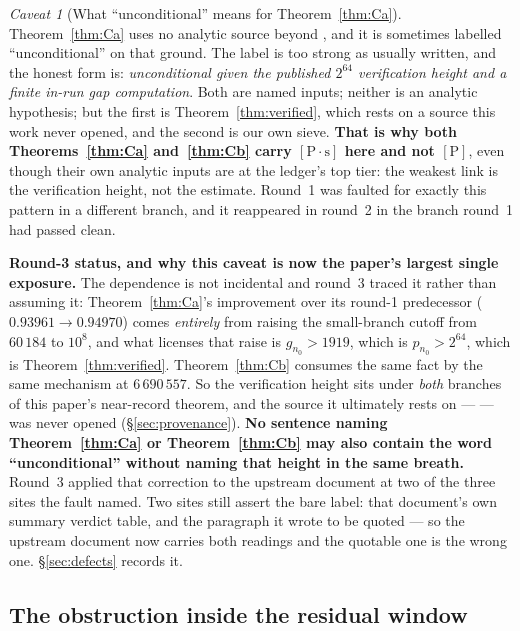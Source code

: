 \documentclass[11pt,a4paper]{article}
\theoremstyle{plain}
\theoremstyle{definition}
\theoremstyle{remark}
\newtheorem{hazard}[theorem]{Caveat}
\newcommand{\cP}{{[\mathrm{P}]}}
\newcommand{\cPs}{{[\mathrm{P}\!\cdot\!\mathrm{s}]}}
\begin{document}
\begin{hazard}[What ``unconditional'' means for Theorem~\ref{thm:Ca}]
\label{haz:uncond}
Theorem~\ref{thm:Ca} uses no analytic source beyond \cite{dusart2010estimates}, and it is
sometimes labelled ``unconditional'' on that ground. The label is too strong as usually
written, and the honest form is: \emph{unconditional given the published $2^{64}$ verification
height and a finite in-run gap computation}. Both are named inputs; neither is an analytic
hypothesis; but the first is Theorem~\ref{thm:verified}, which rests on a source this work
never opened, and the second is our own sieve. \textbf{That is why both
Theorems~\ref{thm:Ca} and~\ref{thm:Cb} carry $\cPs$ here and not $\cP$}, even though their own
analytic inputs are at the ledger's top tier: the weakest link is the verification height, not
the estimate. Round~1 was faulted for exactly this pattern in a different branch, and it
reappeared in round~2 in the branch round~1 had passed clean.

\textbf{Round-3 status, and why this caveat is now the paper's largest single exposure.} The
dependence is not incidental and round~3 traced it rather than assuming it:
Theorem~\ref{thm:Ca}'s improvement over its round-1 predecessor ($0.93961 \to 0.94970$) comes
\emph{entirely} from raising the small-branch cutoff from $60\,184$ to $10^8$, and what
licenses that raise is $g_{n_0} > 1919$, which is $p_{n_0} > 2^{64}$, which is
Theorem~\ref{thm:verified}. Theorem~\ref{thm:Cb} consumes the same fact by the same mechanism
at $6\,690\,557$. So the verification height sits under \emph{both} branches of this paper's
near-record theorem, and the source it ultimately rests on --- \cite{oliveira2014goldbach} ---
was never opened (\S\ref{sec:provenance}). \textbf{No sentence naming Theorem~\ref{thm:Ca} or
Theorem~\ref{thm:Cb} may also contain the word ``unconditional'' without naming that height in
the same breath.} Round~3 applied that correction to the upstream document at two of the three
sites the fault named. Two sites still assert the bare label: that document's own summary
verdict table, and the paragraph it wrote to be quoted --- so the upstream document now carries
both readings and the quotable one is the wrong one. \S\ref{sec:defects} records it.
\end{hazard}

\subsection{The obstruction inside the residual window}
\label{sec:obstruction}
\end{document}
